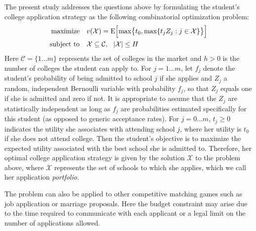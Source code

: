 The present study addresses the questions above by formulating the student's college application strategy as the following combinatorial optimization problem:
\begin{align} \label{headlineproblem}
\begin{split}
\text{maximize}\quad & v(\mathcal{X}) =  \operatorname{E}\Bigl[\max\bigr\{t_0,
\max\{t_j Z_j : j \in \mathcal{X}\}\bigr\}\Bigr] \\
\text{subject to}\quad & \mathcal{X} \subseteq \mathcal{C}, ~~|\mathcal{X}| \leq H
\end{split}
\end{align}
Here $\mathcal{C} = \{ 1 \dots m\}$ represents the set of colleges in the market and $h > 0$ is the number of colleges the student can apply to. For $j = 1 \dots m$, let $f_j$ denote the student's probability of being admitted to school $j$ if she applies and $Z_j$ a random, independent Bernoulli variable with probability $f_j$, so that $Z_j$ equals one if she is admitted and zero if not. It is appropriate to assume that the $Z_j$ are statistically independent as long as $f_j$ are probabilities estimated specifically for this student (as opposed to generic acceptance rates). For $j = 0\dots m$, $t_j\geq 0$ indicates the utility she associates with attending school $j$, where her utility is $t_0$ if she does not attend college. Then the student's objective is to maximize the expected utility associated with the best school she is admitted to. Therefore, her optimal college application strategy is given by the solution $\mathcal{X}$ to the problem above, where $\mathcal{X}$ represents the set of schools to which she applies, which we call her application \emph{portfolio.}

The problem can also be applied to other competitive matching games such as job application or marriage proposals. Here the budget constraint may arise due to the time required to communicate with each applicant or a legal limit on the number of applications allowed.

